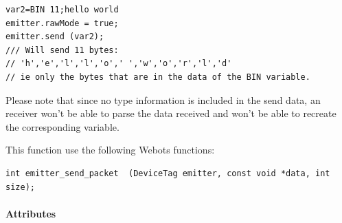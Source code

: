 \begin{description}
\begin{lstlisting}
var2=BIN 11;hello world
emitter.rawMode = true;
emitter.send (var2);
/// Will send 11 bytes:
// 'h','e','l','l','o',' ','w','o','r','l','d'
// ie only the bytes that are in the data of the BIN variable.
\end{lstlisting}

Please note that since no type information is included in the send
data, an \urbi receiver won't be able to parse the data received and
won't be able to recreate the corresponding \urbi variable.


This function use the following Webots functions:


\begin{lstlisting}
int emitter_send_packet  (DeviceTag emitter, const void *data, int size);
\end{lstlisting}
\end{description}

\paragraph{Attributes}
\label{webots.uobjects.robotdevices.emitter.attributes}%

